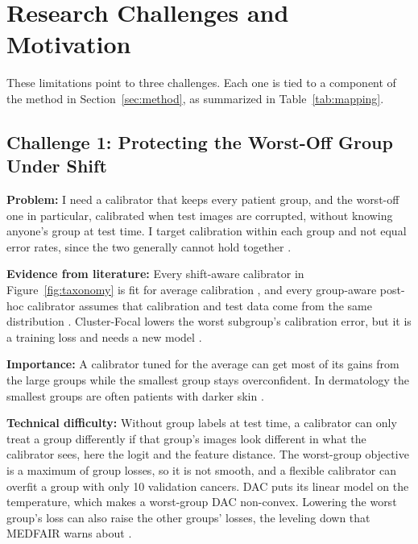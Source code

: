 \documentclass[sigconf,nonacm]{acmart}
\begin{document}
\section{Research Challenges and Motivation}
\label{sec:challenges}

These limitations point to three challenges. Each one is tied to a component of the method in Section~\ref{sec:method}, as summarized in Table~\ref{tab:mapping}.

\subsection{Challenge 1: Protecting the Worst-Off Group Under Shift}
\label{sec:ch1}

\textbf{Problem:} I need a calibrator that keeps every patient group, and the worst-off one in particular, calibrated when test images are corrupted, without knowing anyone's group at test time. I target calibration within each group and not equal error rates, since the two generally cannot hold together \cite{pleiss2017fairness}.

\textbf{Evidence from literature:} Every shift-aware calibrator in Figure~\ref{fig:taxonomy} is fit for average calibration \cite{tomani2021posthoc,yu2022multidomain,tomani2023dac,kim2024energy}, and every group-aware post-hoc calibrator assumes that calibration and test data come from the same distribution \cite{hebertjohnson2018multicalibration,salvador2022faircal,shen2025calin}. Cluster-Focal lowers the worst subgroup's calibration error, but it is a training loss and needs a new model \cite{shui2023clusterfocal}.

\textbf{Importance:} A calibrator tuned for the average can get most of its gains from the large groups while the smallest group stays overconfident. In dermatology the smallest groups are often patients with darker skin \cite{groh2021fitzpatrick}.

\textbf{Technical difficulty:} Without group labels at test time, a calibrator can only treat a group differently if that group's images look different in what the calibrator sees, here the logit and the feature distance. The worst-group objective is a maximum of group losses, so it is not smooth, and a flexible calibrator can overfit a group with only 10 validation cancers. DAC puts its linear model on the temperature, which makes a worst-group DAC non-convex. Lowering the worst group's loss can also raise the other groups' losses, the leveling down that MEDFAIR warns about \cite{zong2023medfair}.
\end{document}
